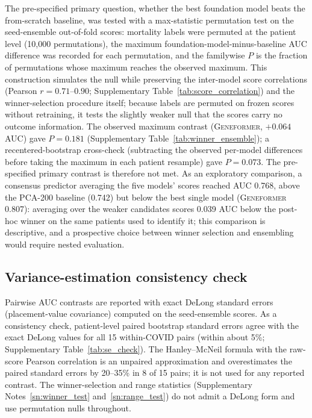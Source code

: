 \documentclass[11pt,a4paper]{article}
\newcommand{\model}[1]{\textsc{#1}}
\begin{document}
The pre-specified primary question, whether the best foundation model beats
the from-scratch baseline, was tested with a max-statistic permutation test on
the seed-ensemble out-of-fold scores: mortality labels were permuted at the
patient level (10{,}000 permutations), the maximum
foundation-model-minus-baseline AUC difference was recorded for each
permutation, and the familywise $P$ is the fraction of permutations whose
maximum reaches the observed maximum. This construction simulates the null
while preserving the inter-model score correlations (Pearson $r = 0.71$--$0.90$;
Supplementary Table~\ref{tab:score_correlation}) and the winner-selection
procedure itself; because labels are permuted on frozen scores without
retraining, it tests the slightly weaker null that the scores carry no
outcome information. The observed maximum contrast (\model{Geneformer},
$+0.064$ AUC) gave $P = 0.181$ (Supplementary
Table~\ref{tab:winner_ensemble}); a
recentered-bootstrap cross-check (subtracting the observed per-model
differences before taking the maximum in each patient resample) gave
$P = 0.073$. The pre-specified primary contrast is therefore not met. As an
exploratory comparison, a consensus predictor averaging the five models'
scores reached AUC 0.768, above the PCA-200 baseline (0.742) but below the
best single model (\model{Geneformer} 0.807): averaging over the weaker
candidates scores 0.039 AUC below the post-hoc winner on the same patients
used to identify it; this comparison is descriptive, and a prospective choice
between winner selection and ensembling would require nested evaluation.

\subsection{Variance-estimation consistency check}
\label{sn:se_check}

Pairwise AUC contrasts are reported with exact DeLong standard errors
(placement-value covariance) computed on the seed-ensemble scores. As a
consistency check, patient-level paired bootstrap standard errors agree with
the exact DeLong values for all 15 within-COVID pairs (within about 5\%;
Supplementary Table~\ref{tab:se_check}). The Hanley--McNeil formula \citep{hanley1982meaning} with the
raw-score Pearson correlation is an unpaired approximation and overestimates
the paired standard errors by 20--35\% in 8 of 15 pairs; it is not used for
any reported contrast. The winner-selection and range statistics
(Supplementary Notes~\ref{sn:winner_test} and~\ref{sn:range_test}) do not
admit a DeLong form and use permutation nulls throughout.
\end{document}
